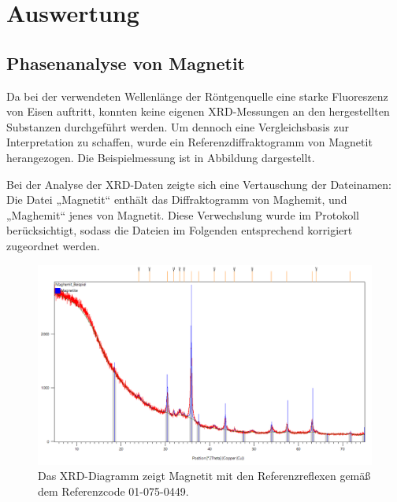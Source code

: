 \documentclass[12pt, a4paper]{article}
\begin{document}
\newpage
\section{Auswertung}
\subsection{Phasenanalyse von Magnetit}

Da bei der verwendeten Wellenlänge der Röntgenquelle eine starke Fluoreszenz von Eisen auftritt, konnten keine eigenen XRD-Messungen an den hergestellten Substanzen durchgeführt werden. 
Um dennoch eine Vergleichsbasis zur Interpretation zu schaffen, wurde ein Referenzdiffraktogramm von Magnetit herangezogen.
Die Beispielmessung ist in Abbildung  dargestellt. 

\noindent
Bei der Analyse der XRD-Daten zeigte sich eine Vertauschung der Dateinamen: Die Datei „Magnetit“ enthält das Diffraktogramm von Maghemit, und „Maghemit“ jenes von Magnetit. Diese Verwechslung wurde im Protokoll berücksichtigt, sodass die Dateien im Folgenden entsprechend korrigiert zugeordnet werden.
\begin{figure}[!h]
    \centering
    \includegraphics[width=0.8\linewidth]{Magnetit.png}
    \caption{Das XRD-Diagramm zeigt Magnetit mit den Referenzreflexen gemäß dem Referenzcode 01-075-0449.}
    \label{Magnetitxrd}
\end{figure}
\end{document}
